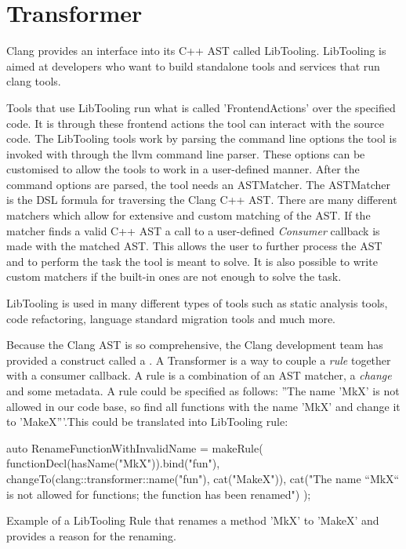 \section{Transformer}

Clang provides an interface into its C++ AST called LibTooling. LibTooling is aimed at developers who want to build standalone tools and services that run clang tools.\cite{LibToolingClang17}

Tools that use LibTooling run what is called 'FrontendActions' over the specified code. It is through these frontend actions the tool can interact with the source code. The LibTooling tools work by parsing the command line options the tool is invoked with through the llvm command line parser. These options can be customised to allow the tools to work in a user-defined manner. After the command options are parsed, the tool needs an ASTMatcher. The ASTMatcher is the DSL formula for traversing the Clang C++ AST. There are many different matchers which allow for extensive and custom matching of the AST.\cite{ASTMatcherReference,MatchingClangAST} If the matcher finds a valid C++ AST a call to a user-defined \textit{Consumer} callback is made with the matched AST. This allows the user to further process the AST and to perform the task the tool is meant to solve.
It is also possible to write custom matchers if the built-in ones are not enough to solve the task.

LibTooling is used in many different types of tools such as static analysis tools, code refactoring, language standard migration tools and much more.\cite{ExternalClangExamples}


Because the Clang AST is so comprehensive, the Clang development team has provided a construct called a . A Transformer is a way to couple a \textit{rule} together with a consumer callback. A rule is a combination of an AST matcher, a \textit{change} and some metadata. A rule could be specified as follows: ''The name 'MkX' is not allowed in our code base, so find all functions with the name 'MkX' and change it to 'MakeX'''.This could be translated into LibTooling rule:

\begin{listing}[H]
    \begin{cppcode}
auto RenameFunctionWithInvalidName = makeRule(
    functionDecl(hasName("MkX")).bind("fun"),
    changeTo(clang::transformer::name("fun"), cat("MakeX")),
    cat("The name ``MkX`` is not allowed for functions; the function has been renamed")
);
    \end{cppcode}
    \caption{Example of a LibTooling Rule that renames a method 'MkX' to 'MakeX' and provides a reason for the renaming.}
    \label{code:080dev:TransformerRuleExample}
\end{listing}

